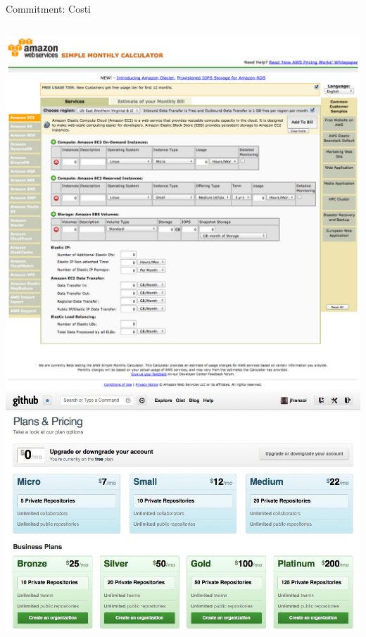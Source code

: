 \documentclass[compress, red, 14pt, pdf]{beamer}
\begin{document}
\begin{frame}{Commitment: Costi}
\begin{columns}[T]
	    \begin{column}{.5\textwidth}
			\hspace*{-0.8cm} \includegraphics[scale=0.13]{images/costs-1}
			\\ \vspace*{-1cm}
			\hspace*{0.2cm} \includegraphics[scale=0.15]{images/costs-2}			
		    \end{column}
		\end{columns}

	\end{frame}
	
\end{document}
